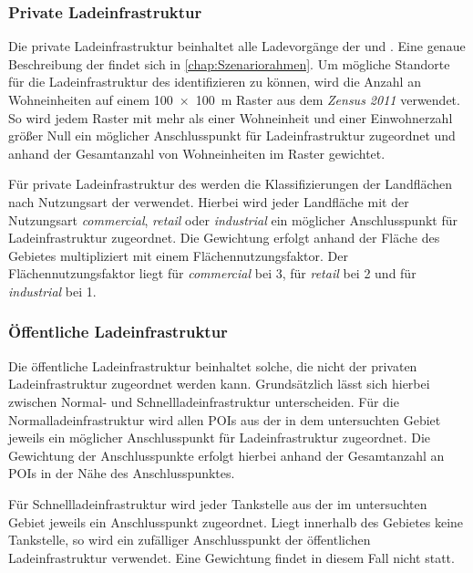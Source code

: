 \subsubsection{Private Ladeinfrastruktur}

Die private Ladeinfrastruktur beinhaltet alle Ladevorgänge der \UCs \zH und \Firmeparkplatzdot.
Eine genaue Beschreibung der \UCs findet sich in \autoref{chap:Szenariorahmen}.
Um mögliche Standorte für die Ladeinfrastruktur des \UC \zH identifizieren zu können, wird die Anzahl an Wohneinheiten auf einem \SI{100 x 100}{\m} Raster aus dem \textit{Zensus 2011} \cite{StatistischesBundesamt2011} verwendet.
So wird jedem Raster mit mehr als einer Wohneinheit und einer Einwohnerzahl größer Null ein möglicher Anschlusspunkt für Ladeinfrastruktur zugeordnet und anhand der Gesamtanzahl von Wohneinheiten im Raster gewichtet. \medskip

Für private Ladeinfrastruktur des \UC \Firmeparkplatz werden die Klassifizierungen der Landflächen nach Nutzungsart der  \cite{OpenStreetMapFoundation} verwendet.
Hierbei wird jeder Landfläche mit der Nutzungsart \textit{commercial}, \textit{retail} oder \textit{industrial} ein möglicher Anschlusspunkt für Ladeinfrastruktur zugeordnet.
Die Gewichtung erfolgt anhand der Fläche des Gebietes multipliziert mit einem Flächennutzungsfaktor.
Der Flächennutzungsfaktor liegt für \textit{commercial} bei \num{3}, für \textit{retail} bei \num{2} und für \textit{industrial} bei \num{1}.


\subsubsection{Öffentliche Ladeinfrastruktur}

Die öffentliche Ladeinfrastruktur beinhaltet solche, die nicht der privaten Ladeinfrastruktur zugeordnet werden kann.
Grundsätzlich lässt sich hierbei zwischen Normal- und Schnellladeinfrastruktur unterscheiden.
Für die Normalladeinfrastruktur wird allen \glspl{POI} aus der  \cite{OpenStreetMapFoundation} in dem untersuchten Gebiet jeweils ein möglicher Anschlusspunkt für Ladeinfrastruktur zugeordnet.
Die Gewichtung der Anschlusspunkte erfolgt hierbei anhand der Gesamtanzahl an \glspl{POI} in der Nähe des Anschlusspunktes.\medskip

Für Schnellladeinfrastruktur wird jeder Tankstelle aus der  \cite{OpenStreetMapFoundation} im untersuchten Gebiet jeweils ein Anschlusspunkt zugeordnet.
Liegt innerhalb des Gebietes keine Tankstelle, so wird ein zufälliger Anschlusspunkt der öffentlichen Ladeinfrastruktur verwendet.
Eine Gewichtung findet in diesem Fall nicht statt.


